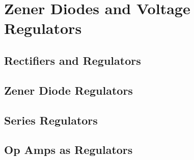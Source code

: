 \chapter{Zener Diodes and Voltage Regulators}
\label{cha:zener_voltage_reg}
    \section{Rectifiers and Regulators}
    \section{Zener Diode Regulators}
    \section{Series Regulators}
    \section{Op Amps as Regulators}